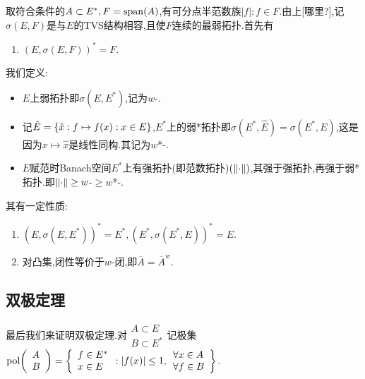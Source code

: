 \documentclass{article}
\begin{document}
取符合条件的$A\subset E^*, F=\mathrm{span}(A)$,有可分点半范数族$|f|:f\in F$.由上[哪里?],记$\sigma(E,F)$是与$E$的TVS结构相容,且使$F$连续的最弱拓扑.首先有
\begin{enumerate}[resume]
    \item $(E,\sigma(E,F))^*=F$.\\
\end{enumerate}

我们定义:
\begin{itemize}
    \item $E$上弱拓扑即$\sigma(E,E^*)$,记为$w$-.
    \item 记$\hat{E}=\left\{\hat{x}:f\mapsto f(x):x\in E\right\}$,$E^*$上的弱*拓扑即$\sigma(E^*,\hat{E})=\sigma(E^*,E)$,这是因为$x\mapsto \hat{x}$是线性同构.其记为$w$*-.
    \item $E$赋范时Banach空间$E^*$上有强拓扑(即范数拓扑)$(\left\|\cdot\right\|)$,其强于强拓扑,再强于弱*拓扑.即$\left\|\cdot\right\|\geq w$-$\geq w$*-.
\end{itemize}

其有一定性质:\begin{enumerate}[resume]
    \item $(E,\sigma(E,E^*))^*=E^*, (E^*,\sigma(E^*,E))^*=E$.
    \item 对凸集,闭性等价于$w$-闭,即$\overline{A}=\overline{A}^w$.
\end{enumerate}

\subsection{双极定理}
最后我们来证明双极定理.对$\begin{array}{l}A\subset E\\B\subset E^*\end{array}$记极集$\mathrm{pol}\!\left(\begin{array}{l}A\\B\end{array}\right)=\left\{\begin{array}{l}f\in E^*\\x\in E\end{array}:\left|f(x)\right|\leq 1,\begin{array}{l}\forall x\in A\\\forall f\in B\end{array}\right\}$.
\end{document}
